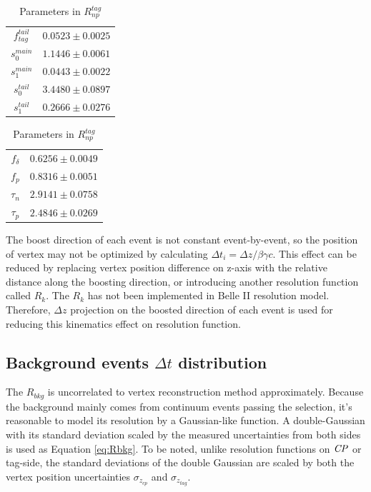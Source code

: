 \begin{table}[H]
	\begin{minipage}[b]{0.5\linewidth}
		\centering
		\caption{Parameters in $R^{tag}_{det}$}
		\label{tab:Rtagdet}
		\begin{tabular}{|c|c|}
			\hline
			$f_{tag}^{tail}$ & $0.0523 \pm 0.0025$\\
			$s_0^{main}$&  $1.1446 \pm 0.0061$ \\
			$s_1^{main}$ & $0.0443\pm 0.0022$\\
			$s_0^{tail}$ &  $3.4480\pm 0.0897$\\
			$s_1^{tail}$  & $0.2666\pm0.0276$ \\
			\hline
		\end{tabular}
	\end{minipage}
	\begin{minipage}[b]{0.5\linewidth}
		\centering
		\caption{Parameters in $R^{tag}_{np}$}
		\label{tab:Rtagnp}
		\begin{tabular}{|c|c|}
			\hline
			$f_{\delta}$ & $0.6256\pm 0.0049$\\
			$f_p$ &  $0.8316 \pm 0.0051$ \\
			$\tau_n$ & $2.9141\pm 0.0758$\\
			$\tau_p$ &  $2.4846\pm 0.0269$\\
			\hline
		\end{tabular}
	\end{minipage}
\end{table}


 The boost direction of each event is not constant event-by-event, so the position of vertex may not be optimized by calculating $\Delta t_i = \Delta z / \beta\gamma c$. This effect can be reduced by replacing vertex position difference on z-axis with the relative distance along the boosting direction, or introducing another resolution function called $R_k$\cite{tajima2004proper}. The $R_k$ has not been implemented in Belle II resolution model. Therefore, $\Delta z$ projection on the boosted direction of each event is used for reducing this kinematics effect on resolution function.



\subsection{Background events $\Delta t$ distribution}
The $R_{bkg}$ is uncorrelated to vertex reconstruction method approximately. Because the background mainly comes from continuum events passing the selection, it's reasonable to model its resolution by a Gaussian-like function. A double-Gaussian with its standard deviation scaled by the measured uncertainties from both sides is used as Equation \ref{eq:Rbkg}. To be noted, unlike resolution functions on $\it{CP}$ or tag-side, the standard deviations of the double Gaussian are scaled by both the vertex position uncertainties $\sigma_{z_{cp}}$ and $\sigma_{z_{tag}}$. 

